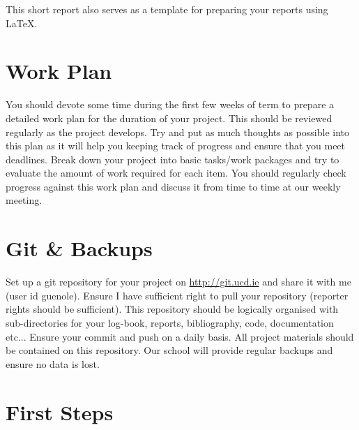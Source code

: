\documentclass[]{weekly-report}
\begin{document}

\def\studentname{Philip Corr}
\def\projecttitle{ConvNets for iOS Gesture Recognition Applications}
\def\ucdstudentnumber{12318581}
\def\weeklyreportnumber{1}
\maketitle


This short report also serves as a template for preparing your reports using \LaTeX.  

\section{Work Plan}

You should devote some time during the first few weeks of term to prepare a detailed work plan for the duration of your project. This should be reviewed regularly as the project develops. Try and put as much thoughts as possible into this plan as it will help you keeping track of progress and ensure that you meet deadlines. Break down your project into basic tasks/work packages and try to evaluate the amount of work required for each item. You should regularly check progress against this work plan and discuss it from time to time at our weekly meeting.

\section{Git \& Backups}

Set up a git repository for your project on \url{http://git.ucd.ie} and share it with me (user id guenole). Ensure I have sufficient right to pull your repository (reporter rights should be sufficient). This repository should be logically organised with sub-directories for your log-book, reports, bibliography, code, documentation etc... Ensure your commit and push on a daily basis. All project materials should be contained on this repository. Our school will provide regular backups and ensure no data is lost.

\section{First Steps}
\end{document}
